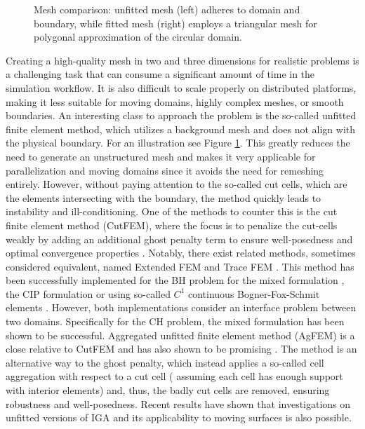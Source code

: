 \documentclass[11pt]{article}
\theoremstyle{remark}
\numberwithin{equation}{section}
\begin{document}
\begin{figure}[h!]
\begin{minipage}{0.45\textwidth}
    \end{minipage}
\caption{Mesh comparison: unfitted mesh (left) adheres to domain and boundary, while fitted mesh (right) employs a triangular mesh for polygonal approximation of the circular domain.}
\label{fig:domain_mesh}
\end{figure}

Creating a high-quality mesh in two and three dimensions for realistic problems is a challenging task that can consume a significant amount of time in the simulation workflow. It is also difficult to scale properly on distributed platforms, making it less suitable for moving domains, highly complex meshes, or smooth boundaries. An interesting class to approach the problem is the so-called unfitted finite element method, which utilizes a background mesh and does not align with the physical boundary. For an illustration
see Figure \ref{fig:domain_mesh}.
This greatly reduces the need to generate an unstructured mesh and makes it very applicable for parallelization and moving domains
since it avoids the need for remeshing entirely. However, without paying attention to the so-called cut cells, which are the elements intersecting with the boundary, the method quickly leads to instability and ill-conditioning.
One of the methods to counter this is the cut finite element method (CutFEM), where the focus is to penalize the cut-cells weakly by adding an additional ghost penalty term to ensure well-posedness and optimal convergence properties \cite{burman2015cutfem}. Notably, there exist related methods, sometimes considered equivalent, named Extended FEM and Trace FEM \cite{cai2021nitsche,zonca2018unfitted}.
This method has been successfully implemented for the BH problem for the
mixed formulation \cite{cai2023nitsche}, the CIP formulation \cite{chen2023arbitrary, cai2021nitsche} or using so-called $C^{1}$ continuous Bogner-Fox-Schmit elements \cite{burman2020cut}.
However, both implementations consider an interface problem between two domains. Specifically for the CH problem, the mixed formulation \cite{karatzas2021reduced} has been shown to be successful.
 Aggregated unfitted finite element method (AgFEM) is a close relative to CutFEM and has also shown to
be promising \cite{badia2018aggregated, badia2022linking}. The method is an alternative way to the ghost penalty, which instead applies a so-called cell aggregation with respect to a cut cell ( assuming each cell has enough support with interior elements) and,
thus, the badly cut cells are removed, ensuring robustness and well-posedness.
Recent results have shown that investigations on unfitted versions of IGA
\cite{zhao2017variational} and its applicability to moving surfaces \cite{zimmermann2019isogeometric} is also possible.
\end{document}
